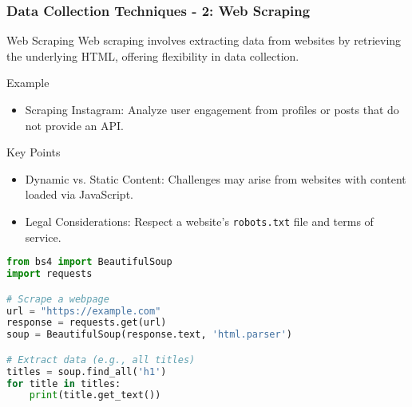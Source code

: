 \documentclass{beamer}
\begin{document}
\begin{frame}[fragile]
    \frametitle{Data Collection Techniques - 2: Web Scraping}
    \begin{block}{Web Scraping}
        Web scraping involves extracting data from websites by retrieving the underlying HTML, offering flexibility in data collection.
    \end{block}

    \begin{exampleblock}{Example}
        \begin{itemize}
            \item Scraping Instagram: Analyze user engagement from profiles or posts that do not provide an API.
        \end{itemize}
    \end{exampleblock}

    \begin{block}{Key Points}
        \begin{itemize}
            \item Dynamic vs. Static Content: Challenges may arise from websites with content loaded via JavaScript.
            \item Legal Considerations: Respect a website's \texttt{robots.txt} file and terms of service.
        \end{itemize}
    \end{block}

    \begin{lstlisting}[language=Python]
from bs4 import BeautifulSoup
import requests

# Scrape a webpage
url = "https://example.com"
response = requests.get(url)
soup = BeautifulSoup(response.text, 'html.parser')

# Extract data (e.g., all titles)
titles = soup.find_all('h1')
for title in titles:
    print(title.get_text())
    \end{lstlisting}
\end{frame}
\end{document}
